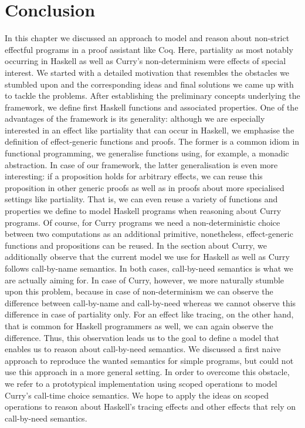 \section{Conclusion}
\label{sec:conclusion}

In this chapter we discussed an approach to model and reason about non\--strict effectful programs in a proof assistant like Coq.
Here, partiality as most notably occurring in Haskell as well as Curry's non\--determinism were effects of special interest.
We started with a detailed motivation that resembles the obstacles we stumbled upon and the corresponding ideas and final solutions we came up with to tackle the problems.
After establishing the preliminary concepts underlying the framework, we define first Haskell functions and associated properties.
One of the advantages of the framework is its generality: although we are especially interested in an effect like partiality that can occur in Haskell, we emphasise the definition of effect\--generic functions and proofs.
The former is a common idiom in functional programming, we generalise functions using, for example, a monadic abstraction.
In case of our framework, the latter generalisation is even more interesting: if a proposition holds for arbitrary effects, we can reuse this proposition in other generic proofs as well as in proofs about more specialised settings like partiality.
That is, we can even reuse a variety of functions and properties we define to model Haskell programs when reasoning about Curry programs.
Of course, for Curry programs we need a non\--deterministic choice between two computations as an additional primitive, nonetheless, effect\--generic functions and propositions can be reused.
In the section about Curry, we additionally observe that the current model we use for Haskell as well as Curry follows call\--by\--name semantics.
In both cases, call\--by\--need semantics is what we are actually aiming for.
In case of Curry, however, we more naturally stumble upon this problem, because in case of non\--determinism we can observe the difference between call\--by\--name and call\--by\--need whereas we cannot observe this difference in case of partiality only.
For an effect like tracing, on the other hand, that is common for Haskell programmers as well, we can again observe the difference.
Thus, this observation leads us to the goal to define a model that enables us to reason about call\--by\--need semantics.
We discussed a first naive approach to reproduce the wanted semantics for simple programs, but could not use this approach in a more general setting.
In order to overcome this obstacle, we refer to a prototypical implementation using scoped operations to model Curry's call\--time choice semantics.
We hope to apply the ideas on scoped operations to reason about Haskell's tracing effects and other effects that rely on call\--by\--need semantics.

